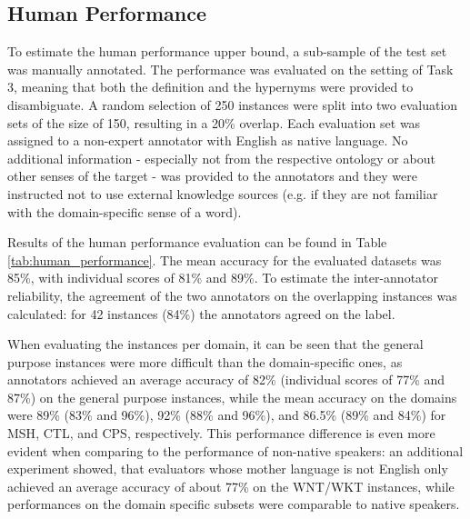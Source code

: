 \documentclass[11pt,a4paper]{article}
\begin{document}
\subsection{Human Performance}
\label{human-performance}
To estimate the human performance upper bound, a sub-sample of the test set was manually annotated. The performance was evaluated on the setting of Task 3, meaning that both the definition and the hypernyms were provided to disambiguate. A random selection of 250 instances were split into two evaluation sets of the size of 150, resulting in a 20\% overlap. Each evaluation set was assigned to a non-expert annotator with English as native language.
No additional information - especially not from the respective ontology or about other senses of the target - was provided to the annotators and they were instructed not to use external knowledge sources (e.g. if they are not familiar with the domain-specific sense of a word). 

Results of the human performance evaluation can be found in Table \ref{tab:human_performance}.
The mean accuracy for the evaluated datasets was 85\%, with individual scores of 81\% and 89\%. To estimate the inter-annotator reliability, the agreement of the two annotators on the overlapping instances was calculated: for 42 instances (84\%) the annotators agreed on the label.

When evaluating the instances per domain, it can be seen that the general purpose instances were more difficult than the domain-specific ones, as annotators achieved an average accuracy of 82\% (individual scores of 77\% and 87\%) on the general purpose instances, while the mean accuracy on the domains were 89\% (83\% and 96\%), 92\% (88\% and 96\%), and 86.5\% (89\% and 84\%) for {MSH}, {CTL}, and {CPS}, respectively.
This performance difference is even more evident when comparing to the performance of non-native speakers: an additional experiment showed, that evaluators whose mother language is not English only achieved an average accuracy of about 77\% on the {WNT/WKT} instances, while performances on the domain specific subsets were comparable to native speakers.
\end{document}
